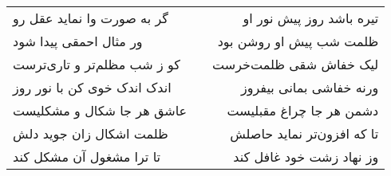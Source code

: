 \begin{center}
\begin{longtable}{l p{0.5cm} r}
\\
گر به صورت وا نماید عقل رو
&&
تیره باشد روز پیش نور او
\\
ور مثال احمقی پیدا شود
&&
ظلمت شب پیش او روشن بود
\\
کو ز شب مظلم‌تر و تاری‌ترست
&&
لیک خفاش شقی ظلمت‌خرست
\\
اندک اندک خوی کن با نور روز
&&
ورنه خفاشی بمانی بیفروز
\\
عاشق هر جا شکال و مشکلیست
&&
دشمن هر جا چراغ مقبلیست
\\
ظلمت اشکال زان جوید دلش
&&
تا که افزون‌تر نماید حاصلش
\\
تا ترا مشغول آن مشکل کند
&&
وز نهاد زشت خود غافل کند
\\
\end{longtable}
\end{center}
